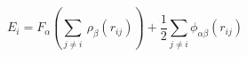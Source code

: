 \documentclass[12pt]{article}
\begin{document}
$$
   E_i = F_\alpha \left(\sum_{j \neq i}\ \rho_\beta (r_{ij})\right) + 
   \frac{1}{2} \sum_{j \neq i} \phi_{\alpha\beta} (r_{ij})
$$
\end{document}
